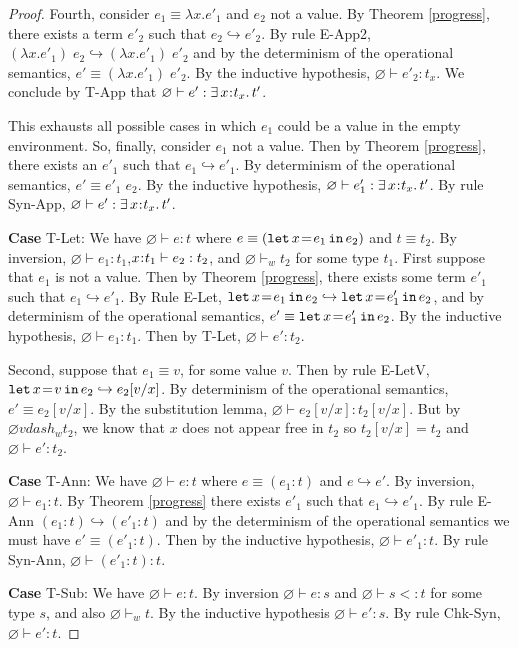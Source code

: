 \documentclass[11pt]{article}
\newcommand{\bind}{\hspace{0.05em}{:}\hspace{0.05em}} %
\newcommand{\step}{\hookrightarrow}
\newcommand{\existype}[3]{\exists\, #1\bind #2.\, #3}
\newcommand{\letin}[3]{{\tt let}\,#1\hspace{0.1em}{=}\hspace{0.1em}#2\,{\tt in}\,#3}
\begin{document}
\begin{proof}
Fourth, consider $e_1 \equiv \lambda x.e'_1$ and $e_2$ not a value. By Theorem \ref{progress}, there exists a term $e'_2$ such that $e_2 \step e'_2$. By rule {\sc E-App2}, $(\lambda x.e'_1)\; e_2 \step (\lambda x.e'_1)\; e'_2$ and by the determinism of the operational semantics, $e' \equiv (\lambda x.e'_1)\; e'_2$.
By the inductive hypothesis, $\varnothing \vdash e'_2 : t_x$. We conclude by {\sc T-App} that $\varnothing \vdash e' : \existype{x}{t_x}{t'}$.

This exhausts all possible cases in which $e_1$ could be a value in the empty environment. So, finally, consider $e_1$ not a value.
Then by Theorem \ref{progress}, there exists an $e'_1$ such that $e_1 \hookrightarrow e'_1$. By determinism of the operational semantics, $e' \equiv e'_1\; e_2$. By the inductive hypothesis,
$\varnothing \vdash e'_1 : \existype{x}{t_x}{t'}$. By rule {\sc Syn-App}, $\varnothing \vdash e' : \existype{x}{t_x}{t'}$.

{\bf Case} {\sc T-Let}: We have $\varnothing \vdash e : t$ where $e \equiv (\letin{x}{e_1}{e_2})$ and $t \equiv t_2$. By inversion,
$\varnothing \vdash e_1 : t_1$,\quad $x\bind t_1\vdash e_2 : t_2$, and $\varnothing \vdash_w t_2$ for some type $t_1$. 
First suppose that $e_1$ is not a value. Then by Theorem \ref{progress}, there exists some term $e'_1$ such that $e_1 \step e'_1$. By Rule {\sc E-Let}, $\letin{x}{e_1}{e_2} \step \letin{x}{e'_1}{e_2}$, and by determinism of the operational semantics, $e' \equiv \letin{x}{e'_1}{e_2}$. By the inductive hypothesis, $\varnothing \vdash e_1 : t_1$. Then by {\sc T-Let}, $\varnothing \vdash e' : t_2$.

Second, suppose that $e_1 \equiv v$, for some value $v$. Then by rule {\sc E-LetV}, $\letin{x}{v}{e_2}\step e_2[v/x]$. By determinism of the operational semantics, $e' \equiv e_2[v/x]$. By the substitution lemma, $\varnothing \vdash e_2[v/x] : t_2[v/x]$. But by $\varnothing vdash_w t_2$, we know that $x$ does not appear free in $t_2$ so $t_2[v/x] = t_2$ and $\varnothing \vdash e' : t_2$.

{\bf Case} {\sc T-Ann}: We have $\varnothing \vdash e : t$ where $e \equiv (e_1 : t)$ and $e \hookrightarrow e'$. By inversion,
$\varnothing \vdash e_1 : t$. By Theorem \ref{progress} there exists $e'_1$ such that $e_1 \hookrightarrow e'_1$. By rule {\sc E-Ann} $(e_1 : t) \hookrightarrow (e'_1 : t)$ and by the determinism of the operational semantics we must have $e' \equiv (e'_1 : t)$. Then by the inductive hypothesis, $\varnothing \vdash e'_1 : t$. By rule {\sc Syn-Ann}, $\varnothing \vdash (e'_1 : t) : t$. 

{\bf Case} {\sc T-Sub}: We have $\varnothing \vdash e : t$. By inversion $\varnothing \vdash e : s$ and $\varnothing \vdash s <: t$ for some type $s$, and also $\varnothing \vdash_w t$. By the inductive hypothesis $\varnothing \vdash e' : s$. By rule {\sc Chk-Syn}, $\varnothing \vdash e' : t$.
\end{proof}
\end{document}
